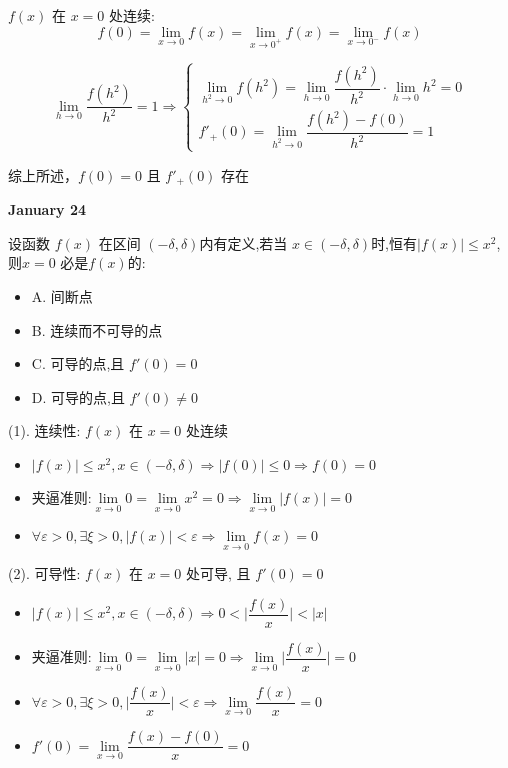\begin{solution}

	$f(x)$ 在 $x=0$ 处连续:
	$$f(0) = \lim\limits_{x\to 0}f(x) = \lim\limits_{x\to 0^{+}}f(x) = \lim\limits_{x\to 0^{-}}f(x)$$

	$$\lim\limits_{h\to 0}\dfrac{f(h^{2})}{h^{2}}=1\Rightarrow 
	\begin{cases}
		\lim\limits_{h^{2}\to 0}f(h^{2}) = \lim\limits_{h\to 0}\dfrac{f(h^{2})}{h^{2}}\cdot \lim\limits_{h\to 0}h^{2}=0\\
		f'_{+}(0) = \lim\limits_{h^{2}\to 0}\dfrac{f(h^{2})-f(0)}{h^{2}}=1
	\end{cases}$$

	综上所述，$f(0) = 0$ 且 $f'_{+}(0)$ 存在 
\end{solution}
\textcolor{purplea}{\textbf{January 24}}

\begin{example}[][Exam: 27.4.5]
	设函数 $f(x)$ 在区间 $(-\delta,\delta)$内有定义,若当 $x\in(-\delta,\delta)$时,恒有$|f(x)|\leq x^{2}$,则$x=0$ 必是$f(x)$的:
\begin{itemize}
	\item A. 间断点
	\item B. 连续而不可导的点
	\item C. 可导的点,且 $f'(0)=0$
	\item D. 可导的点,且 $f'(0)\neq 0$
\end{itemize}
\end{example}

\begin{solution}

	(1). 连续性: $f(x)$ 在 $x = 0$ 处连续
	\begin{itemize}
		\item $|f(x)|\leq x^{2}, x\in (-\delta,\delta)\Rightarrow |f(0)|\leq 0\Rightarrow f(0) = 0$
		\item 夹逼准则:$\lim\limits_{x\to 0} 0 = \lim\limits_{x\to 0}x^{2} = 0\Rightarrow \lim\limits_{x\to 0} |f(x)| = 0$
		\item $\forall \varepsilon > 0 ,\exists \xi > 0, |f(x)| < \varepsilon \Rightarrow  \lim\limits_{x\to 0} f(x) = 0$
	\end{itemize}

	(2). 可导性: $f(x)$ 在 $x = 0$ 处可导, 且 $f'(0) = 0$
	\begin{itemize}
		\item $|f(x)|\leq x^{2}, x\in (-\delta,\delta)\Rightarrow 0 < \big|\dfrac{f(x)}{x}\big| < |x|$
		\item 夹逼准则:$\lim\limits_{x\to 0} 0 = \lim\limits_{x\to 0}|x| = 0\Rightarrow \lim\limits_{x\to 0} \big|\dfrac{f(x)}{x}\big| = 0$
		\item $\forall \varepsilon > 0 ,\exists \xi > 0, \big|\dfrac{f(x)}{x}\big| < \varepsilon \Rightarrow  \lim\limits_{x\to 0} \dfrac{f(x)}{x} = 0$
		\item $f'(0) = \lim\limits_{x\to 0} \dfrac{f(x)-f(0)}{x} = 0$
	\end{itemize}
\end{solution}

